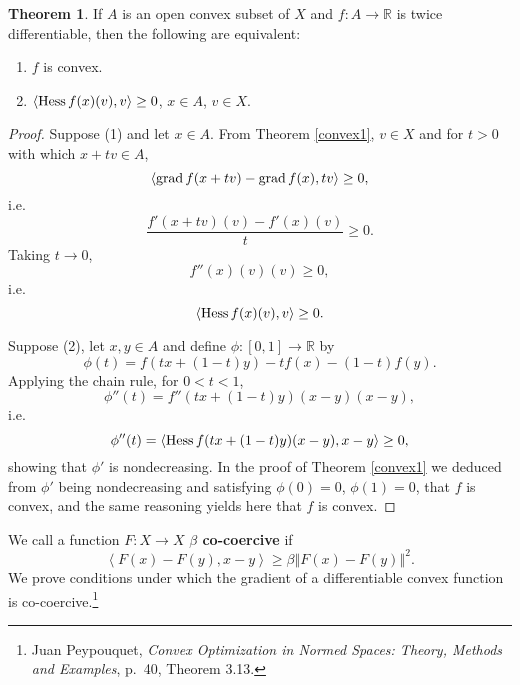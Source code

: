 \documentclass{article}
\newcommand{\inner}[2]{\left\langle #1, #2 \right\rangle}
\newcommand{\grad}{\ensuremath\mathrm{grad}\,}
\newcommand{\Hess}{\ensuremath\mathrm{Hess}\,}
\newcommand{\norm}[1]{\left\Vert #1 \right\Vert}
\theoremstyle{definition}
\newtheorem{theorem}{Theorem}
\theoremstyle{definition}
\begin{document}
\begin{theorem}
If $A$ is an open convex subset of $X$ and $f:A \to \mathbb{R}$ is twice differentiable, then the following are equivalent:
\begin{enumerate}
\item $f$ is convex.
\item $\inner{\Hess f(x)(v)}{v} \geq 0$, $x \in A$, $v \in X$. 
\end{enumerate}
\end{theorem}
\begin{proof}
Suppose (1) and let $x \in A$. From Theorem \ref{convex1}, $v \in X$ and for $t>0$ with which $x+tv \in A$,
\[
\inner{\grad f(x+tv)-\grad f(x)}{tv} \geq 0,
\]
i.e.
\[
\frac{f'(x+tv)(v)- f'(x)(v)}{t} \geq 0.
\] 
Taking $t \to 0$,
\[
f''(x)(v)(v) \geq 0,
\]
i.e.
\[
\inner{\Hess f(x)(v)}{v} \geq 0.
\]

Suppose (2), let $x,y \in A$ and define $\phi:[0,1] \to \mathbb{R}$ by
\[
\phi(t) = f(tx+(1-t)y)-tf(x)-(1-t)f(y).
\] 
Applying the chain rule, for $0<t<1$,
\[
\phi''(t) = f''(tx+(1-t)y)(x-y)(x-y),
\]
i.e.
\[
\phi''(t) = \inner{\Hess f(tx+(1-t)y)(x-y)}{x-y} \geq 0,
\]
showing that $\phi'$ is nondecreasing. 
In the proof of Theorem \ref{convex1} we deduced from $\phi'$ being nondecreasing and satisfying
$\phi(0)=0$, $\phi(1)=0$, that $f$ is convex, and the same reasoning yields here that $f$ is convex.
\end{proof}


We call a function $F:X \to X$ \textbf{$\beta$ co-coercive} if 
\[
\inner{F(x)-F(y)}{x-y} \geq \beta \norm{F(x)-F(y)}^2.
\]
We prove conditions under which the gradient of a  differentiable convex function is co-coercive.\footnote{Juan Peypouquet,
{\em Convex Optimization in Normed Spaces: Theory, Methods and Examples}, p.~40, Theorem 3.13.}
\end{document}
